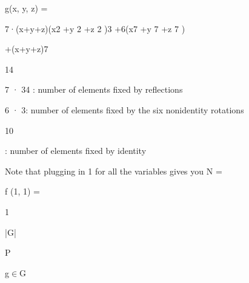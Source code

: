 \documentclass[a4paper,portrait,12pt]{article}
\begin{document}
\begin{flushleft}
g(x, y, z) =
\end{flushleft}





\begin{flushleft}
7·(x+y+z)(x2 +y 2 +z 2 )3 +6(x7 +y 7 +z 7 )
\end{flushleft}


\begin{flushleft}
+(x+y+z)7
\end{flushleft}





14





\begin{flushleft}
7 · 34 : number of elements fixed by reflections
\end{flushleft}


\begin{flushleft}
6 · 3: number of elements fixed by the six nonidentity rotations
\end{flushleft}


10





\begin{flushleft}
 : number of elements fixed by identity
\end{flushleft}


\begin{flushleft}
Note that plugging in 1 for all the variables gives you N =
\end{flushleft}


\begin{flushleft}
f (1, 1) =
\end{flushleft}





1


\begin{flushleft}
|G|
\end{flushleft}





\begin{flushleft}
P
\end{flushleft}





\begin{flushleft}
g$\in$G
\end{flushleft}
\end{document}
